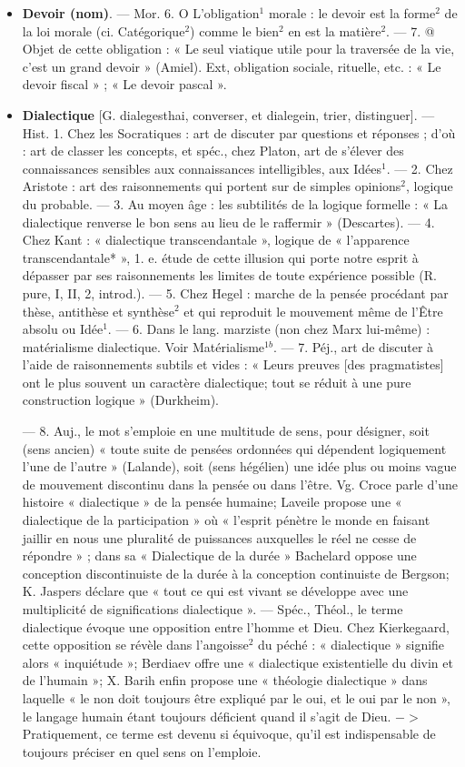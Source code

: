 \begin{itemize}[leftmargin=1cm, label=, itemsep=1pt]
\item {\bf Devoir (nom)}. — Mor. 6. O L’obligation$^1$ morale : le devoir est la forme$^2$
de la loi morale (ci. Catégorique$^2$)
comme le bien$^2$ en est la matière$^2$. —
7. @ Objet de cette obligation : « Le
seul viatique utile pour la traversée
de la vie, c’est un grand devoir »
(Amiel). Ext, obligation sociale,
rituelle, etc. : « Le devoir fiscal » ;
« Le devoir pascal ».

\item {\bf Dialectique} [G. dialegesthai, converser, et dialegein, trier, distinguer].
— Hist. 1. Chez les Socratiques : art
de discuter par questions et réponses ; d'où : art de classer les concepts,
et spéc., chez Platon, art de s'élever
des connaissances sensibles aux
connaissances  intelligibles, aux
Idées$^1$. — 2. Chez Aristote : art des
raisonnements qui portent sur de
simples opinions$^2$, logique du probable. — 3. Au moyen âge : les subtilités de la logique formelle : « La
dialectique renverse le bon sens au
lieu de le raffermir » (Descartes). —
4. Chez Kant : « dialectique transcendantale », logique de « l’apparence transcendantale* », 1. e. étude
de cette illusion qui porte notre
esprit à dépasser par ses raisonnements les limites de toute expérience possible (R. pure, I, II, 2,
introd.). — 5. Chez Hegel : marche de
la pensée procédant par thèse, antithèse et synthèse$^2$ et qui reproduit
le mouvement même de l’Être
absolu ou Idée$^1$. — 6. Dans le lang.
marziste (non chez Marx lui-même) :
matérialisme dialectique. Voir Matérialisme$^{1b}$. — 7. Péj., art de discuter
à l’aide de raisonnements subtils et
vides : « Leurs preuves [des pragmatistes] ont le plus souvent un caractère
dialectique; tout se réduit à une pure
construction logique » (Durkheim).

— 8. Auj., le mot s'emploie en
une multitude de sens, pour désigner, soit (sens ancien) « toute suite
de pensées ordonnées qui dépendent
logiquement l’une de l’autre » (Lalande), soit (sens hégélien) une idée
plus ou moins vague de mouvement
discontinu dans la pensée ou dans
l’être. Vg. Croce parle d’une histoire
« dialectique » de la pensée humaine;
Laveile propose une « dialectique de
la participation » où « l'esprit pénètre
le monde en faisant jaillir en nous
une pluralité de puissances auxquelles le réel ne cesse de répondre » ;
dans sa « Dialectique de la durée »
Bachelard oppose une conception
discontinuiste de la durée à la conception continuiste de Bergson;
K. Jaspers déclare que « tout ce qui
est vivant se développe avec une
multiplicité de significations dialectique ». — Spéc., Théol., le terme
dialectique évoque une opposition
entre l'homme et Dieu. Chez Kierkegaard, cette opposition se révèle
dans l’angoisse$^2$ du péché : « dialectique » signifie alors « inquiétude »;
Berdiaev offre une « dialectique
existentielle du divin et de l’humain »; X. Barih enfin propose une
« théologie dialectique » dans laquelle « le non doit toujours être
expliqué par le oui, et le oui par le
non », le langage humain étant toujours déficient quand il s’agit de
Dieu. $->$ Pratiquement, ce terme
est devenu si équivoque, qu'il est
indispensable de toujours préciser
en quel sens on l’emploie.


\end{itemize}
